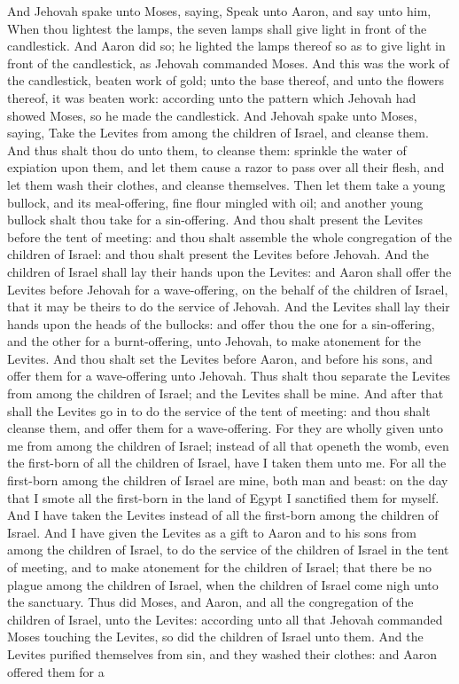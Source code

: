 And Jehovah spake unto Moses, saying, Speak unto Aaron, and say unto him, When thou lightest the lamps, the seven lamps shall give light in front of the candlestick. And Aaron did so; he lighted the lamps thereof so as to give light in front of the candlestick, as Jehovah commanded Moses. And this was the work of the candlestick, beaten work of gold; unto the base thereof, and unto the flowers thereof, it was beaten work: according unto the pattern which Jehovah had showed Moses, so he made the candlestick.  And Jehovah spake unto Moses, saying, Take the Levites from among the children of Israel, and cleanse them. And thus shalt thou do unto them, to cleanse them: sprinkle the water of expiation upon them, and let them cause a razor to pass over all their flesh, and let them wash their clothes, and cleanse themselves. Then let them take a young bullock, and its meal-offering, fine flour mingled with oil; and another young bullock shalt thou take for a sin-offering. And thou shalt present the Levites before the tent of meeting: and thou shalt assemble the whole congregation of the children of Israel: and thou shalt present the Levites before Jehovah. And the children of Israel shall lay their hands upon the Levites: and Aaron shall offer the Levites before Jehovah for a wave-offering, on the behalf of the children of Israel, that it may be theirs to do the service of Jehovah. And the Levites shall lay their hands upon the heads of the bullocks: and offer thou the one for a sin-offering, and the other for a burnt-offering, unto Jehovah, to make atonement for the Levites. And thou shalt set the Levites before Aaron, and before his sons, and offer them for a wave-offering unto Jehovah.  Thus shalt thou separate the Levites from among the children of Israel; and the Levites shall be mine. And after that shall the Levites go in to do the service of the tent of meeting: and thou shalt cleanse them, and offer them for a wave-offering. For they are wholly given unto me from among the children of Israel; instead of all that openeth the womb, even the first-born of all the children of Israel, have I taken them unto me. For all the first-born among the children of Israel are mine, both man and beast: on the day that I smote all the first-born in the land of Egypt I sanctified them for myself. And I have taken the Levites instead of all the first-born among the children of Israel. And I have given the Levites as a gift to Aaron and to his sons from among the children of Israel, to do the service of the children of Israel in the tent of meeting, and to make atonement for the children of Israel; that there be no plague among the children of Israel, when the children of Israel come nigh unto the sanctuary.  Thus did Moses, and Aaron, and all the congregation of the children of Israel, unto the Levites: according unto all that Jehovah commanded Moses touching the Levites, so did the children of Israel unto them. And the Levites purified themselves from sin, and they washed their clothes: and Aaron offered them for a 